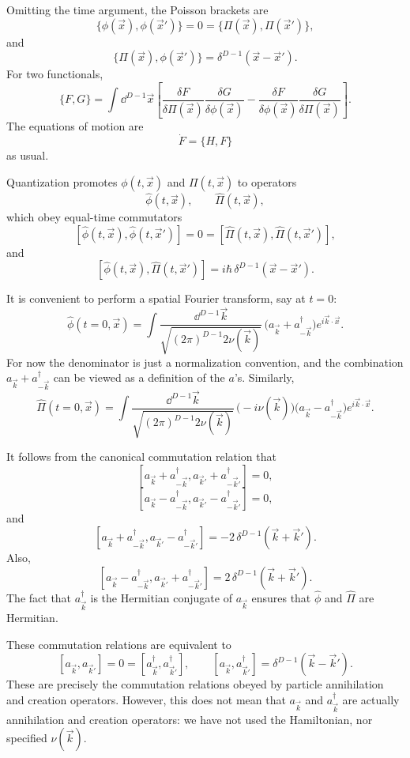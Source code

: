 Omitting the time argument, the Poisson brackets are
\[
  \{\phi(\vec x),\phi(\vec x')\}=0=\{\Pi(\vec x),\Pi(\vec x')\},
\]
and
\[
  \{\Pi(\vec x),\phi(\vec x')\}
  =\delta^{D-1}(\vec x-\vec x').
\]
For two functionals,
\[
  \{F,G\}
  =
  \int\dd^{D-1}\vec x\left[
    \frac{\delta F}{\delta\Pi(\vec x)}
    \frac{\delta G}{\delta\phi(\vec x)}
    -
    \frac{\delta F}{\delta\phi(\vec x)}
    \frac{\delta G}{\delta\Pi(\vec x)}
  \right].
\]
The equations of motion are
\[
  \dot F=\{H,F\}
\]
as usual.

Quantization promotes \(\phi(t,\vec x)\) and \(\Pi(t,\vec x)\) to operators
\[
  \hat\phi(t,\vec x),\qquad \hat\Pi(t,\vec x),
\]
which obey equal-time commutators
\[
  [\hat\phi(t,\vec x),\hat\phi(t,\vec x')]
  =0=
  [\hat\Pi(t,\vec x),\hat\Pi(t,\vec x')],
\]
and
\[
  [\hat\phi(t,\vec x),\hat\Pi(t,\vec x')]
  =
  i\hbar\,\delta^{D-1}(\vec x-\vec x').
\]

It is convenient to perform a spatial Fourier transform, say at \(t=0\):
\[
  \hat\phi(t=0,\vec x)
  =
  \int
  \frac{\dd^{D-1}\vec k}
  {\sqrt{(2\pi)^{D-1}2\nu(\vec k)}}\,
  \bigl(a_{\vec k}+a^\dagger_{-\vec k}\bigr)
  e^{i\vec k\cdot\vec x}.
\]
For now the denominator is just a normalization convention, and the
combination \(a_{\vec k}+a^\dagger_{-\vec k}\) can be viewed as a definition
of the \(a\)'s. Similarly,
\[
  \hat\Pi(t=0,\vec x)
  =
  \int
  \frac{\dd^{D-1}\vec k}
  {\sqrt{(2\pi)^{D-1}2\nu(\vec k)}}\,
  \bigl(-i\nu(\vec k)\bigr)
  \bigl(a_{\vec k}-a^\dagger_{-\vec k}\bigr)
  e^{i\vec k\cdot\vec x}.
\]

It follows from the canonical commutation relation that
\[
  [a_{\vec k}+a^\dagger_{-\vec k},
   a_{\vec k'}+a^\dagger_{-\vec k'}]=0,
\]
\[
  [a_{\vec k}-a^\dagger_{-\vec k},
   a_{\vec k'}-a^\dagger_{-\vec k'}]=0,
\]
and
\[
  [a_{\vec k}+a^\dagger_{-\vec k},
   a_{\vec k'}-a^\dagger_{-\vec k'}]
  =
  -2\,\delta^{D-1}(\vec k+\vec k').
\]
Also,
\[
  [a_{\vec k}-a^\dagger_{-\vec k},
   a_{\vec k'}+a^\dagger_{-\vec k'}]
  =
  2\,\delta^{D-1}(\vec k+\vec k').
\]
The fact that \(a^\dagger_{\vec k}\) is the Hermitian conjugate of
\(a_{\vec k}\) ensures that \(\hat\phi\) and \(\hat\Pi\) are Hermitian.

These commutation relations are equivalent to
\[
  [a_{\vec k},a_{\vec k'}]=0=[a^\dagger_{\vec k},a^\dagger_{\vec k'}],
  \qquad
  [a_{\vec k},a^\dagger_{\vec k'}]
  =
  \delta^{D-1}(\vec k-\vec k').
\]
These are precisely the commutation relations obeyed by particle annihilation
and creation operators. However, this does not mean that \(a_{\vec k}\) and
\(a^\dagger_{\vec k}\) are actually annihilation and creation operators: we
have not used the Hamiltonian, nor specified \(\nu(\vec k)\).

